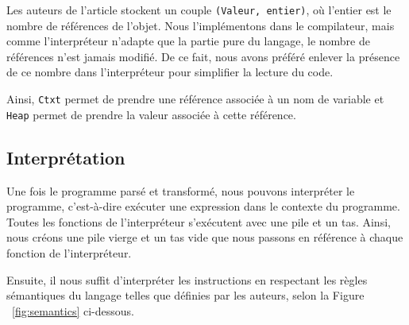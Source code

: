 \documentclass{rapportECL}
\begin{document}
Les auteurs de l'article stockent un couple \verb|(Valeur, entier)|, où l'entier est le nombre de références de l'objet. Nous l'implémentons dans
le compilateur, mais comme l'interpréteur n'adapte que la partie pure du langage, le nombre de références n'est jamais modifié. De ce 
fait, nous avons préféré enlever la présence de ce nombre dans l'interpréteur pour simplifier la lecture du code.

\medskip

Ainsi, \verb|Ctxt| permet de prendre une référence associée à un nom de variable et \verb|Heap| permet de prendre la valeur associée à cette référence.

\bigskip

\subsection{Interprétation}

Une fois le programme parsé et transformé, nous pouvons interpréter le programme, c'est-à-dire exécuter une expression dans le 
contexte du programme. Toutes les fonctions de l'interpréteur s'exécutent avec une pile et un tas. Ainsi, nous créons une pile vierge
et un tas vide que nous passons en référence à chaque fonction de l'interpréteur.

Ensuite, il nous suffit d'interpréter les instructions en respectant les règles sémantiques du langage telles que définies par les auteurs, 
selon la Figure ~\ref{fig:semantics} ci-dessous.
\end{document}
